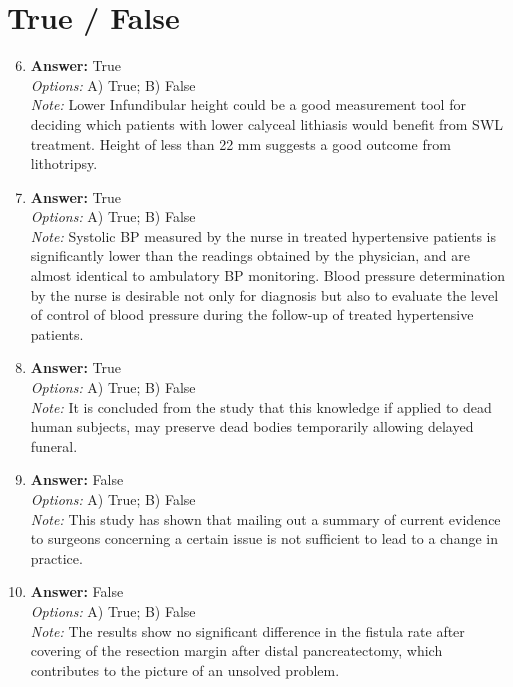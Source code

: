 \documentclass[12pt]{article}
\begin{document}
\section*{True / False}
\begin{enumerate}[label=\arabic*.]
\setcounter{enumi}{5}
\item \textbf{Answer:} True
\\ \textit{Options:} A) True; B) False
\\ \textit{Note:} Lower Infundibular height could be a good measurement tool for deciding which patients with lower calyceal lithiasis would benefit from SWL treatment. Height of less than 22 mm suggests a good outcome from lithotripsy.
\item \textbf{Answer:} True
\\ \textit{Options:} A) True; B) False
\\ \textit{Note:} Systolic BP measured by the nurse in treated hypertensive patients is significantly lower than the readings obtained by the physician, and are almost identical to ambulatory BP monitoring. Blood pressure determination by the nurse is desirable not only for diagnosis but also to evaluate the level of control of blood pressure during the follow-up of treated hypertensive patients.
\item \textbf{Answer:} True
\\ \textit{Options:} A) True; B) False
\\ \textit{Note:} It is concluded from the study that this knowledge if applied to dead human subjects, may preserve dead bodies temporarily allowing delayed funeral.
\item \textbf{Answer:} False
\\ \textit{Options:} A) True; B) False
\\ \textit{Note:} This study has shown that mailing out a summary of current evidence to surgeons concerning a certain issue is not sufficient to lead to a change in practice.
\item \textbf{Answer:} False
\\ \textit{Options:} A) True; B) False
\\ \textit{Note:} The results show no significant difference in the fistula rate after covering of the resection margin after distal pancreatectomy, which contributes to the picture of an unsolved problem.
\end{enumerate}
\end{document}
